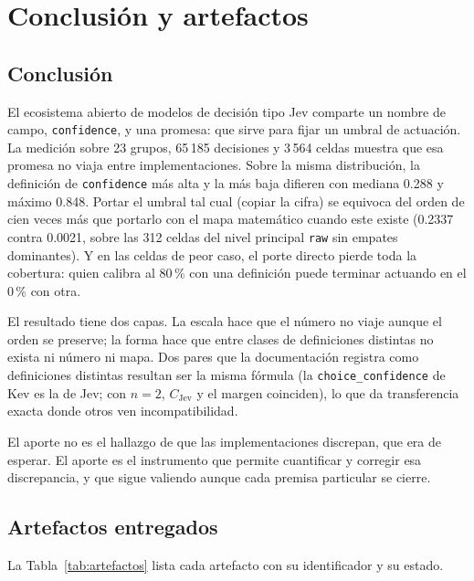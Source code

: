 \section{Conclusión y artefactos}
\label{sec:conclusion}

\subsection{Conclusión}

El ecosistema abierto de modelos de decisión tipo Jev comparte un nombre de campo, \texttt{confidence}, y una promesa: que sirve para fijar un umbral de actuación. La medición sobre 23 grupos, 65\,185 decisiones y 3\,564 celdas muestra que esa promesa no viaja entre implementaciones. Sobre la misma distribución, la definición de \texttt{confidence} más alta y la más baja difieren con mediana 0.288 y máximo 0.848. Portar el umbral tal cual (copiar la cifra) se equivoca del orden de cien veces más que portarlo con el mapa matemático cuando este existe (0.2337 contra 0.0021, sobre las 312 celdas del nivel principal \texttt{raw} sin empates dominantes). Y en las celdas de peor caso, el porte directo pierde toda la cobertura: quien calibra al 80\,\% con una definición puede terminar actuando en el 0\,\% con otra.

El resultado tiene dos capas. La escala hace que el número no viaje aunque el orden se preserve; la forma hace que entre clases de definiciones distintas no exista ni número ni mapa. Dos pares que la documentación registra como definiciones distintas resultan ser la misma fórmula (la \texttt{choice\_confidence} de Kev es la de Jev; con $n=2$, $C_{\mathrm{Jev}}$ y el margen coinciden), lo que da transferencia exacta donde otros ven incompatibilidad.

El aporte no es el hallazgo de que las implementaciones discrepan, que era de esperar. El aporte es el instrumento que permite cuantificar y corregir esa discrepancia, y que sigue valiendo aunque cada premisa particular se cierre.

\subsection{Artefactos entregados}

La Tabla~\ref{tab:artefactos} lista cada artefacto con su identificador y su estado.


